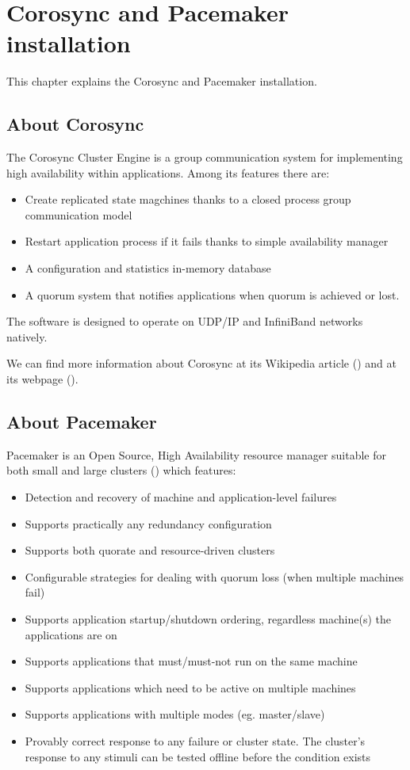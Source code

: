

\chapter{Corosync and Pacemaker installation}
This chapter explains the Corosync and Pacemaker installation.

\section {About Corosync}
The Corosync Cluster Engine is a group communication system for implementing high availability within applications. Among its features there are:
\begin{itemize}
  \item Create replicated state magchines thanks to a closed process group communication model
  \item Restart application process if it fails thanks to simple availability manager
  \item A configuration and statistics in-memory database
  \item A quorum system that notifies applications when quorum is achieved or lost.
\end{itemize}


The software is designed to operate on UDP/IP and InfiniBand networks natively.

We can find more information about Corosync at its Wikipedia article (\cite{WikipediaCorosync}) and at its webpage (\cite{CorosyncWebpage}).

\section {\label{sec:about-pacemaker}About Pacemaker}

Pacemaker is an Open Source, High Availability resource manager suitable for both small and large clusters (\cite{PacemakerWebpage}) which features:
\begin{itemize}
  \item Detection and recovery of machine and application-level failures
  \item Supports practically any redundancy configuration
  \item Supports both quorate and resource-driven clusters
  \item Configurable strategies for dealing with quorum loss (when multiple machines fail)
  \item Supports application startup/shutdown ordering, regardless machine(s) the applications are on
  \item Supports applications that must/must-not run on the same machine
  \item Supports applications which need to be active on multiple machines
  \item Supports applications with multiple modes (eg. master/slave)
  \item Provably correct response to any failure or cluster state. The cluster's response to any stimuli can be tested offline before the condition exists
\end{itemize}

